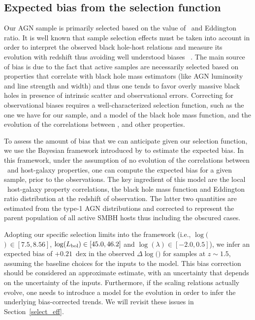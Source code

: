 \documentclass[apj]{emulateapj}
\begin{document}
\subsection{Expected bias from the selection function}

\label{sec:sf_framework}

Our AGN sample is primarily selected based on the value of \mbh~and Eddington ratio. It is well known that sample selection effects must be taken into account in order to  interpret the observed black hole-host relations and measure its evolution with redshift thus avoiding well understood biases ~\citep{Tre++07,Schulze2011,Bennert++2011, Schulze2014,Park15}. The main source of bias is due to the fact that active samples are necessarily selected based on properties that correlate with black hole mass estimators (like AGN luminosity and line strength and width) and thus one tends to favor overly massive black holes in presence of intrinsic scatter and observational errors. Correcting for observational biases requires a well-characterized selection function, such as the one we have for our sample, and a model of the black hole mass function, and the evolution of the correlations between \mbh, and other properties.

To assess the amount of bias that we can anticipate given our selection function, we use the Bayesian framework introduced by \citet{Schulze2011,Schulze2014} to estimate the expected bias. In this framework, under the assumption of no evolution of the correlations between \mbh\ and host-galaxy properties, one can compute the expected bias for a given sample, prior to the observations. The key ingredient of this model are the local \mbh\ host-galaxy property correlations, the black hole mass function and Eddington ratio distribution at the redshift of observation. The latter two quantities are estimated from the type-1 AGN distributions \citep{Schulze2015} and corrected to represent the parent population of all active SMBH hosts thus including the obscured cases. 

Adopting our specific selection limits into the framework (i.e., $\log($\mbh$)~\in[7.5, 8.56]$, $\log(L_{\rm bol}) \in [45.0, 46.2] $ and  $\log(\lambda) \in [-2.0, 0.5]$), we infer an expected bias of $+0.21$~dex in the observed $\Delta\log($\mbh$)$ for samples at $z\sim1.5$, assuming the baseline choices for the inputs to the model. This bias correction should be considered an approximate estimate, with an uncertainty that depends on the uncertainty of the inputs. Furthermore, if the scaling relations actually evolve, one needs to introduce a model for the evolution in order to infer the underlying bias-corrected trends. We will revisit these issues in Section~\ref{select_eff}.
\end{document}
